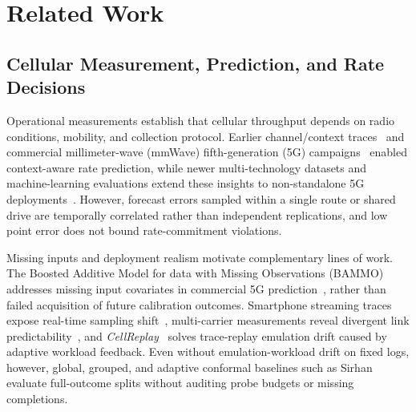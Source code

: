 \section{Related Work}
\label{sec:related_work}

\subsection{Cellular Measurement, Prediction, and Rate Decisions}
Operational measurements establish that cellular throughput depends on radio conditions, mobility, and collection protocol. Earlier channel/context traces~\cite{raca2020} and commercial millimeter-wave (mmWave) fifth-generation (5G) campaigns~\cite{narayanan2020} enabled context-aware rate prediction, while newer multi-technology datasets and machine-learning evaluations extend these insights to non-standalone 5G deployments~\cite{kousias2024data,caso2024,kousias2024model}. However, forecast errors sampled within a single route or shared drive are temporally correlated rather than independent replications, and low point error does not bound rate-commitment violations.

Missing inputs and deployment realism motivate complementary lines of work. The Boosted Additive Model for data with Missing Observations (BAMMO) addresses missing input covariates in commercial 5G prediction~\cite{jacobson2025}, rather than failed acquisition of future calibration outcomes. Smartphone streaming traces expose real-time sampling shift~\cite{raca2024}, multi-carrier measurements reveal divergent link predictability~\cite{basit2024}, and \emph{CellReplay}~\cite{sentosa2025cellreplay} solves trace-replay emulation drift caused by adaptive workload feedback. Even without emulation-workload drift on fixed logs, however, global, grouped, and adaptive conformal baselines such as Sirhan~\cite{sirhan2026} evaluate full-outcome splits without auditing probe budgets or missing completions.


